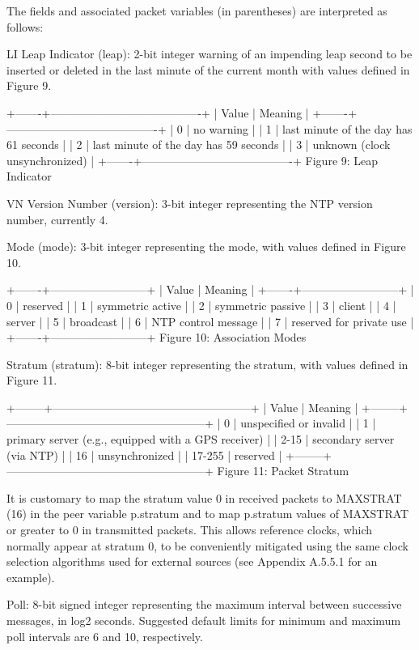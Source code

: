 The fields and associated packet variables (in parentheses) are
interpreted as follows:

LI Leap Indicator (leap): 2-bit integer warning of an impending leap
second to be inserted or deleted in the last minute of the current
month with values defined in Figure 9.

+-------+----------------------------------------+
| Value | Meaning |
+-------+----------------------------------------+
| 0 | no warning |
| 1 | last minute of the day has 61 seconds |
| 2 | last minute of the day has 59 seconds |
| 3 | unknown (clock unsynchronized) |
+-------+----------------------------------------+
Figure 9: Leap Indicator

VN Version Number (version): 3-bit integer representing the NTP
version number, currently 4.

Mode (mode): 3-bit integer representing the mode, with values defined
in Figure 10.

+-------+--------------------------+
| Value | Meaning |
+-------+--------------------------+
| 0 | reserved |
| 1 | symmetric active |
| 2 | symmetric passive |
| 3 | client |
| 4 | server |
| 5 | broadcast |
| 6 | NTP control message |
| 7 | reserved for private use |
+-------+--------------------------+
Figure 10: Association Modes

Stratum (stratum): 8-bit integer representing the stratum, with
values defined in Figure 11.

+--------+-----------------------------------------------------+
| Value | Meaning |
+--------+-----------------------------------------------------+
| 0 | unspecified or invalid |
| 1 | primary server (e.g., equipped with a GPS receiver) |
| 2-15 | secondary server (via NTP) |
| 16 | unsynchronized |
| 17-255 | reserved |
+--------+-----------------------------------------------------+
Figure 11: Packet Stratum

It is customary to map the stratum value 0 in received packets to
MAXSTRAT (16) in the peer variable p.stratum and to map p.stratum
values of MAXSTRAT or greater to 0 in transmitted packets. This
allows reference clocks, which normally appear at stratum 0, to be
conveniently mitigated using the same clock selection algorithms used
for external sources (see Appendix A.5.5.1 for an example).

Poll: 8-bit signed integer representing the maximum interval between
successive messages, in log2 seconds. Suggested default limits for
minimum and maximum poll intervals are 6 and 10, respectively.

